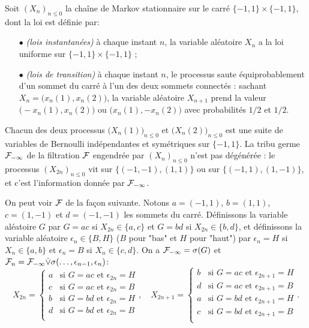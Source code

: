 \documentclass[12pt,a4paper]{article}
\begin{document}
\begin{exemple}
Soit ${(X_n)}_{n \leq 0}$ la chaîne de Markov stationnaire sur le carré 
$\{-1,1\}\times\{-1,1\}$, dont la loi est définie par:
\begin{itemize}
\item[$\bullet$] \emph{(lois instantanées)} à chaque instant $n$, la variable aléatoire 
$X_n$ a la loi uniforme sur $\{-1,1\}\times\{-1,1\}$ ;

\item[$\bullet$] \emph{(lois de transition)} à chaque instant $n$, le processus 
saute équiprobablement d'un sommet du carré à l'un des deux sommets connectés : 
sachant $X_n=\bigl(x_n(1), x_n(2)\bigr)$, la variable aléatoire $X_{n+1}$ 
prend la valeur $\bigl(-x_n(1), x_n(2)\bigr)$ ou $\bigl(x_n(1), -x_n(2)\bigr)$ avec 
probabilités $1/2$ et $1/2$. 
\end{itemize}
Chacun des deux processus ${\bigl(X_n(1)\bigr)}_{n \leq 0}$ et ${\bigl(X_n(2)\bigr)}_{n \leq 0}$ 
est une suite de variables de Bernoulli indépendantes et symétriques sur $\{-1,1\}$. 
La tribu germe $\mathcal{F}_{-\infty}$ de la filtration $\mathcal{F}$ engendrée par 
${(X_n)}_{n \leq 0}$ n'est pas dégénérée : le processus ${(X_{2n})}_{n \leq 0}$ 
vit sur $\bigl\{(-1,-1), (1,1)\bigr\}$ ou sur $\bigl\{(-1,1), (1,-1)\bigr\}$, 
et c'est l'information donnée par $\mathcal{F}_{-\infty}$. 

On peut voir $\mathcal{F}$ de la façon suivante. 
Notons $a=(-1,1)$, $b=(1,1)$, $c=(1,-1)$ et $d=(-1,-1)$ les sommets du carré. 
Définissons la variable aléatoire $G$ par $G=ac$ si $X_{2n} \in \{a,c\}$ et 
$G=bd$ si  $X_{2n} \in \{b,d\}$, et définissons 
la variable aléatoire $\epsilon_n \in \{B,H\}$ ($B$ pour "bas" et $H$ pour "haut") 
par $\epsilon_n=H$ si $X_n \in \{a,b\}$ 
et $\epsilon_n=B$ si $X_n \in \{c,d\}$. 
On a $\mathcal{F}_{-\infty} = \sigma(G)$ et 
$\mathcal{F}_n = \mathcal{F}_{-\infty} \dot{\vee} \sigma(\ldots, \epsilon_{n-1}, \epsilon_n)$:
$$
X_{2n} = \begin{cases}
a & \text{si $G=ac$ et $\epsilon_{2n}=H$} \\
c & \text{si $G=ac$ et $\epsilon_{2n}=B$} \\
b & \text{si $G=bd$ et $\epsilon_{2n}=H$} \\
d & \text{si $G=bd$ et $\epsilon_{2n}=B$} \\
\end{cases},
\quad
X_{2n+1} = \begin{cases}
b & \text{si $G=ac$ et $\epsilon_{2n+1}=H$} \\
d & \text{si $G=ac$ et $\epsilon_{2n+1}=B$} \\
a & \text{si $G=bd$ et $\epsilon_{2n+1}=H$} \\
c & \text{si $G=bd$ et $\epsilon_{2n+1}=B$} \\
\end{cases}.
$$
%
\end{exemple}
\end{document}
